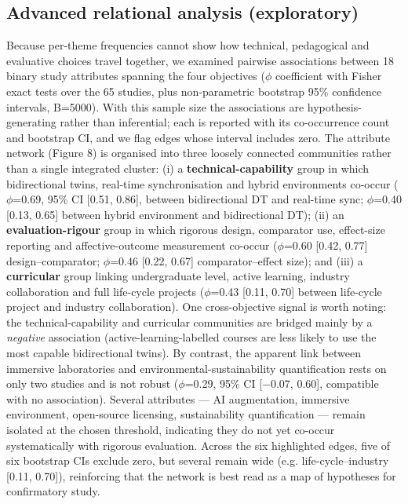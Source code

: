 \subsection{Advanced relational analysis (exploratory)}\label{advanced-relational-analysis-exploratory}

Because per-theme frequencies cannot show how technical, pedagogical and
evaluative choices travel together, we examined pairwise associations between 18
binary study attributes spanning the four objectives (\ensuremath{\phi} coefficient with Fisher
exact tests over the 65 studies, plus non-parametric bootstrap 95\% confidence
intervals, B=5000).
With this sample size the associations are hypothesis-generating rather than
inferential; each is reported with its co-occurrence count and bootstrap CI, and
we flag edges whose interval includes zero. The attribute network (Figure 8) is
organised into three loosely connected communities rather than a single
integrated cluster: (i) a \textbf{technical-capability} group in which bidirectional
twins, real-time synchronisation and hybrid environments co-occur (\ensuremath{\phi}=0.69,
95\% CI {[}0.51, 0.86{]}, between bidirectional DT and real-time sync; \ensuremath{\phi}=0.40
{[}0.13, 0.65{]} between hybrid environment and bidirectional DT); (ii) an
\textbf{evaluation-rigour} group in which rigorous design, comparator use,
effect-size reporting and affective-outcome measurement co-occur (\ensuremath{\phi}=0.60
{[}0.42, 0.77{]} design--comparator; \ensuremath{\phi}=0.46 {[}0.22, 0.67{]} comparator--effect size);
and (iii) a \textbf{curricular} group linking undergraduate level, active learning,
industry collaboration and full life-cycle projects (\ensuremath{\phi}=0.43 {[}0.11, 0.70{]} between
life-cycle project and industry collaboration). One cross-objective signal is
worth noting: the technical-capability and curricular communities are bridged
mainly by a \emph{negative} association (active-learning-labelled courses are less
likely to use the most capable bidirectional twins). By contrast, the apparent
link between immersive laboratories and environmental-sustainability
quantification rests on only two studies and is not robust (\ensuremath{\phi}=0.29, 95\% CI
{[}\ensuremath{-}0.07, 0.60{]}, compatible with no association). Several attributes --- AI
augmentation, immersive environment, open-source licensing, sustainability
quantification --- remain isolated at the chosen threshold, indicating they do not
yet co-occur systematically with rigorous evaluation. Across the six highlighted
edges, five of six bootstrap CIs exclude zero, but several remain wide (e.g.
life-cycle--industry {[}0.11, 0.70{]}), reinforcing that the network is best read as
a map of hypotheses for confirmatory study.

